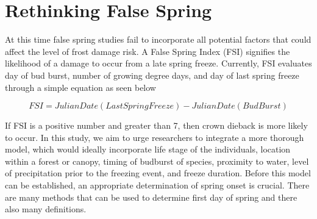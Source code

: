 \documentclass{article}\usepackage[]{graphicx}\usepackage[]{color}
\begin{document}
\section*{Rethinking False Spring}
At this time false spring studies fail to incorporate all potential factors that could affect the level of frost damage risk. A False Spring Index (FSI) signifies the likelihood of a damage to occur from a late spring freeze. Currently, FSI evaluates day of bud burst, number of growing degree days, and day of last spring freeze through a simple equation as seen below %

\[ FSI = Julian Date (Last Spring Freeze) - Julian Date (Bud Burst) \]

If FSI is a positive number and greater than 7, then crown dieback is more likely to occur. In this study, we aim to urge researchers to integrate a more thorough model, which would ideally incorporate life stage of the individuals, location within a forest or canopy, timing of budburst of species, proximity to water, level of precipitation prior to the freezing event, and freeze duration. Before this model can be established, an appropriate determination of spring onset is crucial. There are many methods that can be used to determine first day of spring and there also many definitions. 
\end{document}
